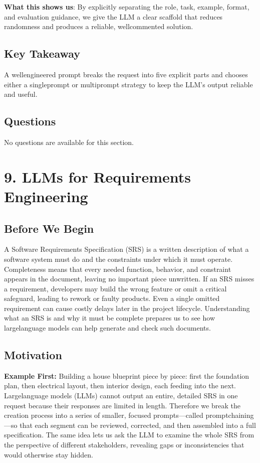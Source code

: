 \documentclass[12pt, a4paper]{article}
\begin{document}
\textbf{What this shows us}: By explicitly separating the role, task, example, format, and evaluation guidance, we give the LLM a clear scaffold that reduces randomness and produces a reliable, wellcommented solution.

\subsection{Key Takeaway}
A wellengineered prompt breaks the request into five explicit parts and chooses either a singleprompt or multiprompt strategy to keep the LLM's output reliable and useful.

\subsection*{Questions}
No questions are available for this section.

\newpage

\newpage

\section{9. LLMs for Requirements Engineering}

\subsection{Before We Begin}
A Software Requirements Specification (SRS) is a written description of what a software system must do and the constraints under which it must operate.  
Completeness means that every needed function, behavior, and constraint appears in the document, leaving no important piece unwritten.  
If an SRS misses a requirement, developers may build the wrong feature or omit a critical safeguard, leading to rework or faulty products.  
Even a single omitted requirement can cause costly delays later in the project lifecycle.  
Understanding what an SRS is and why it must be complete prepares us to see how largelanguage models can help generate and check such documents.

\subsection{Motivation}
\textbf{Example First:} Building a house blueprint piece by piece: first the foundation plan, then electrical layout, then interior design, each feeding into the next.  
Largelanguage models (LLMs) cannot output an entire, detailed SRS in one request because their responses are limited in length.  
Therefore we break the creation process into a series of smaller, focused prompts---called promptchaining---so that each segment can be reviewed, corrected, and then assembled into a full specification.  
The same idea lets us ask the LLM to examine the whole SRS from the perspective of different stakeholders, revealing gaps or inconsistencies that would otherwise stay hidden.
\end{document}

